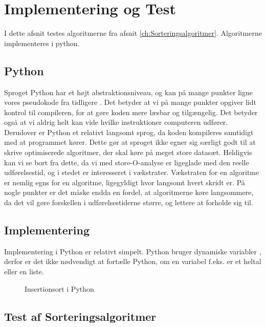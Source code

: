 \chapter{Implementering og Test}
\label{ch:Implementering og test af Algoritmerne}

I dette afsnit testes algoritmerne fra afsnit \ref{ch:Sorteringsalgoritmer}. Algoritmerne implementeres i python.

\section{Python}
\label{sec:Python}

Sproget Python har et højt abstraktionsniveau, og kan på mange punkter ligne vores pseudokode fra tidligere \cite[s. 68]{aogd}. Det betyder at vi på mange punkter opgiver lidt kontrol til compileren, for at gøre koden mere læsbar og tilgængelig. Det betyder også at vi aldrig helt kan vide hvilke instruktioner computeren udfører. Derudover er Python et relativt langsomt sprog, da koden kompileres samtidigt med at programmet kører. Dette gør at sproget ikke egner sig særligt godt til at skrive optimiserede algoritmer, der skal køre på meget store datasæt. Heldigvis kan vi se bort fra dette, da vi med store-O-analyse er ligeglade med den reelle udførelsestid, og i stedet er interesseret i vækstrater. Vækstraten for en algoritme er nemlig egns for en algoritme, ligegyldigt hvor langsomt hvert skridt er. På nogle punkter er det måske endda en fordel, at algoritmerne køre langsommere, da det vil gøre forskellen i udførelsestiderne større, og lettere at forholde sig til. 


\section{Implementering}
\label{sec:Implementering}

Implementering i Python er relativt simpelt. Python bruger dynamiske variabler \cite{what-is-python}, derfor er det ikke nødvendigt at fortælle Python, om en variabel f.eks. er et heltal eller en liste. \red{[kode??]}

\begin{figure}
	\begin{center}
		
	\end{center}
	\caption{Insertionsort i Python}
	\label{fig:Insertionsort i Python}
\end{figure}

\section{Test af Sorteringsalgoritmer}
\label{sec:Test af Sorteringsalgoritmer}

